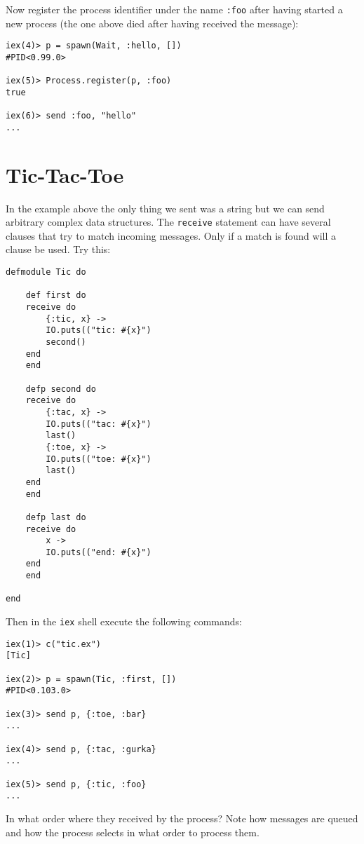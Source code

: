 \documentclass[a4paper,11pt]{article}
\begin{document}
Now register the process identifier under the name {\tt :foo} after having started a new process (the one above died after having received the message):

\begin{verbatim}
iex(4)> p = spawn(Wait, :hello, [])
#PID<0.99.0>

iex(5)> Process.register(p, :foo)
true

iex(6)> send :foo, "hello"
...
\end{verbatim}



\section{Tic-Tac-Toe}

In the example above the only thing we sent was a string but
we can send arbitrary complex data structures. The {\tt receive}
statement can have several clauses that try to match incoming
messages. Only if a match is found will a clause be used. Try this:

\begin{verbatim}
defmodule Tic do

    def first do
    receive do
        {:tic, x} ->
        IO.puts(("tic: #{x}")
        second()
    end
    end
    
    defp second do
    receive do
        {:tac, x} ->
        IO.puts(("tac: #{x}")
        last()
        {:toe, x} ->
        IO.puts(("toe: #{x}")
        last()
    end
    end

    defp last do
    receive do
        x ->
        IO.puts(("end: #{x}")
    end
    end

end
\end{verbatim}

Then in the {\tt iex} shell execute the following commands:

\begin{verbatim}
iex(1)> c("tic.ex")
[Tic]

iex(2)> p = spawn(Tic, :first, [])
#PID<0.103.0>

iex(3)> send p, {:toe, :bar}
...

iex(4)> send p, {:tac, :gurka}
...

iex(5)> send p, {:tic, :foo}
...
\end{verbatim}

In what order where they received by the process? Note how messages
are queued and how the process selects in what order to process them.
\end{document}
